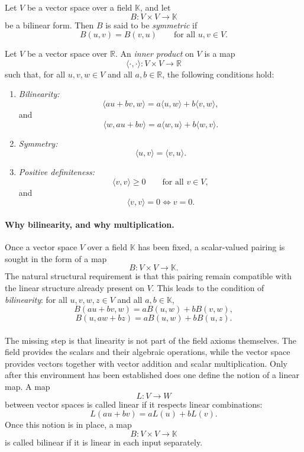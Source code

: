 \documentclass{article}
\begin{document}
	\begin{definition}
		Let $V$ be a vector space over a field $\mathbb{K}$, and let
		$$
		B:V\times V\to\mathbb{K}
		$$
		be a bilinear form. Then $B$ is said to be \emph{symmetric} if
		$$
		B(u,v)=B(v,u)
		\qquad
		\text{for all }u,v\in V.
		$$
	\end{definition}
	
	\begin{definition}
		Let $V$ be a vector space over $\mathbb{R}$. An \emph{inner product} on $V$ is a map
		$$
		\langle\cdot,\cdot\rangle:V\times V\to\mathbb{R}
		$$
		such that, for all $u,v,w\in V$ and all $a,b\in\mathbb{R}$, the following conditions hold:
		\begin{enumerate}
			\item \emph{Bilinearity:}
			$$
			\langle au+bv,w\rangle=a\langle u,w\rangle+b\langle v,w\rangle,
			$$
			and
			$$
			\langle w,au+bv\rangle=a\langle w,u\rangle+b\langle w,v\rangle.
			$$
			
			\item \emph{Symmetry:}
			$$
			\langle u,v\rangle=\langle v,u\rangle.
			$$
			
			\item \emph{Positive definiteness:}
			$$
			\langle v,v\rangle\ge 0
			\qquad
			\text{for all }v\in V,
			$$
			and
			$$
			\langle v,v\rangle=0 \iff v=0.
			$$
		\end{enumerate}
	\end{definition}
	
	\paragraph{Why bilinearity, and why multiplication.}
	Once a vector space $V$ over a field $\mathbb{K}$ has been fixed, a scalar-valued pairing is sought in the form of a map
	$$
	B:V\times V\to \mathbb{K}.
	$$
	The natural structural requirement is that this pairing remain compatible with the linear structure already present on $V$. This leads to the condition of \emph{bilinearity}: for all $u,v,w,z\in V$ and all $a,b\in\mathbb{K}$,
	$$
	B(au+bv,w)=aB(u,w)+bB(v,w),
	$$
	$$
	B(u,aw+bz)=aB(u,w)+bB(u,z).
	$$
	
	\paragraph{}
	The missing step is that linearity is not part of the field axioms themselves. The field provides the scalars and their algebraic operations, while the vector space provides vectors together with vector addition and scalar multiplication. Only after this environment has been established does one define the notion of a linear map. A map
	$$
	L:V\to W
	$$
	between vector spaces is called linear if it respects linear combinations:
	$$
	L(au+bv)=aL(u)+bL(v).
	$$
	Once this notion is in place, a map
	$$
	B:V\times V\to\mathbb{K}
	$$
	is called bilinear if it is linear in each input separately.
\end{document}
